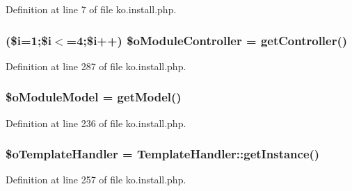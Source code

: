 Definition at line 7 of file ko.\+install.\+php.

\subsubsection[{\texorpdfstring{\$o\+Module\+Controller}{$oModuleController}}]{ (\${\bf i}=1;\${\bf i}$<$=4;\${\bf i}++) \$o\+Module\+Controller = {\bf get\+Controller}(\textquotesingle{})}\hypertarget{ko_8install_8php_a9fd93f6625cec4fd65bf6f412e28c015}{}\label{ko_8install_8php_a9fd93f6625cec4fd65bf6f412e28c015}


Definition at line 287 of file ko.\+install.\+php.

\subsubsection[{\texorpdfstring{\$o\+Module\+Model}{$oModuleModel}}]{\setlength{\rightskip}{0pt plus 5cm}\$o\+Module\+Model = {\bf get\+Model}(\textquotesingle{})}\hypertarget{ko_8install_8php_a8d7a87df524e7d6938f66f8e284cdd1e}{}\label{ko_8install_8php_a8d7a87df524e7d6938f66f8e284cdd1e}


Definition at line 236 of file ko.\+install.\+php.

\subsubsection[{\texorpdfstring{\$o\+Template\+Handler}{$oTemplateHandler}}]{\setlength{\rightskip}{0pt plus 5cm}\$o\+Template\+Handler = {\bf Template\+Handler\+::get\+Instance}()}\hypertarget{ko_8install_8php_abd57e3ab220291ea9b5c16c2a4e0670e}{}\label{ko_8install_8php_abd57e3ab220291ea9b5c16c2a4e0670e}


Definition at line 257 of file ko.\+install.\+php.

